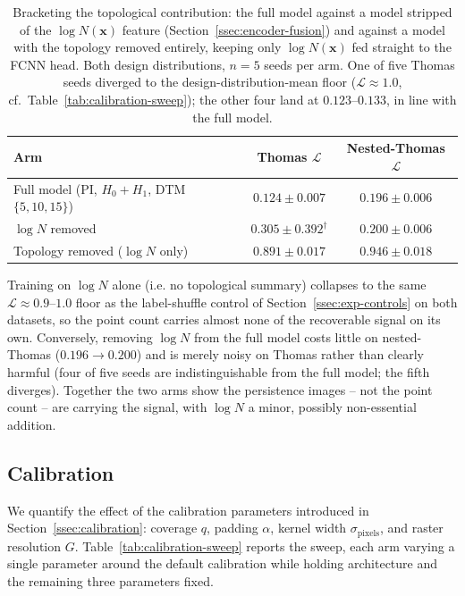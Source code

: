\documentclass[11pt,letterpaper]{article}
\newcommand{\1}{\mathds{1}}
\newcommand{\pc}{\mathbf{x}}
\theoremstyle{plain}
\theoremstyle{definitioncolon}
\begin{document}
\begin{table}[tbp]
\centering
\small
\begin{tabular}{lcc}
\toprule
Arm & Thomas $\mathcal{L}$ & Nested-Thomas $\mathcal{L}$ \\
\midrule
Full model (PI, $H_0{+}H_1$, DTM$\{5,10,15\}$) & $0.124 \pm 0.007$ & $0.196 \pm 0.006$ \\
$\log N$ removed & $0.305 \pm 0.392^\dagger$ & $0.200 \pm 0.006$ \\
Topology removed ($\log N$ only) & $0.891 \pm 0.017$ & $0.946 \pm 0.018$ \\
\bottomrule
\end{tabular}
\caption{Bracketing the topological contribution: the full model against a
model stripped of the $\log N(\pc)$ feature (Section~\ref{ssec:encoder-fusion})
and against a model with the topology removed entirely, keeping only $\log
N(\pc)$ fed straight to the FCNN head. Both design distributions, $n=5$ seeds
per arm. One of five Thomas seeds diverged to the design-distribution-mean
floor ($\mathcal{L}\approx1.0$, cf.\ Table~\ref{tab:calibration-sweep}); the
other four land at $0.123$--$0.133$, in line with the full model.}
\label{tab:logn-ablation}
\end{table}

Training on $\log N$ alone (i.e. no topological summary) collapses to the same
$\mathcal{L}\approx0.9$--$1.0$ floor as the label-shuffle control of
Section~\ref{ssec:exp-controls} on both datasets, so the point count carries
almost none of the recoverable signal on its own. Conversely, removing $\log N$ from the
full model costs little on nested-Thomas ($0.196\to0.200$) and is
merely noisy on Thomas rather than clearly harmful (four of five seeds are
indistinguishable from the full model; the fifth diverges). Together the two
arms show the persistence images -- not the point count -- are carrying the
signal, with $\log N$ a minor, possibly non-essential addition.

\subsection{Calibration}
\label{ssec:exp-calibration}

We quantify the effect
of the calibration parameters introduced in Section~\ref{ssec:calibration}:
coverage $q$, padding $\alpha$, kernel width $\sigma_{\text{pixels}}$, and
raster resolution $G$. Table~\ref{tab:calibration-sweep} reports the
sweep, each arm varying a single parameter around the default
calibration while holding architecture and the remaining three parameters
fixed.
\end{document}

